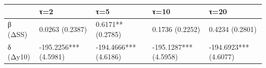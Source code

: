 \begin{tabular}{lllll}
\toprule
 & τ=2 & τ=5 & τ=10 & τ=20 \\
\midrule
β (ΔSS) & 0.0263
(0.2387) & 0.6171**
(0.2785) & 0.1736
(0.2252) & 0.4234
(0.2801) \\
δ (Δy10) & -195.2256***
(4.5981) & -194.4666***
(4.6186) & -195.1287***
(4.5958) & -194.6923***
(4.6077) \\
\bottomrule
\end{tabular}
